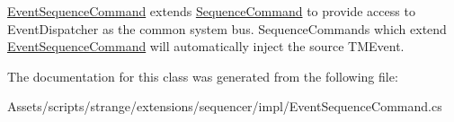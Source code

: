 \hyperlink{classstrange_1_1extensions_1_1sequencer_1_1impl_1_1_event_sequence_command}{Event\-Sequence\-Command} extends \hyperlink{classstrange_1_1extensions_1_1sequencer_1_1impl_1_1_sequence_command}{Sequence\-Command} to provide access to Event\-Dispatcher as the common system bus. Sequence\-Commands which extend \hyperlink{classstrange_1_1extensions_1_1sequencer_1_1impl_1_1_event_sequence_command}{Event\-Sequence\-Command} will automatically inject the source T\-M\-Event. 

The documentation for this class was generated from the following file\-:\begin{DoxyCompactItemize}
\item 
Assets/scripts/strange/extensions/sequencer/impl/Event\-Sequence\-Command.\-cs\end{DoxyCompactItemize}
